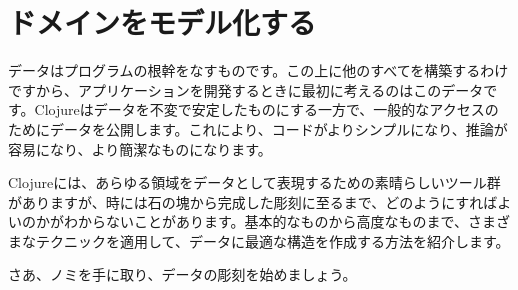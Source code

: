 \chapter{ドメインをモデル化する}


データはプログラムの根幹をなすものです。この上に他のすべてを構築するわけですから、アプリケーションを開発するときに最初に考えるのはこのデータです。Clojureはデータを不変で安定したものにする一方で、一般的なアクセスのためにデータを公開します。これにより、コードがよりシンプルになり、推論が容易になり、より簡潔なものになります。

Clojureには、あらゆる領域をデータとして表現するための素晴らしいツール群がありますが、時には石の塊から完成した彫刻に至るまで、どのようにすればよいのかがわからないことがあります。基本的なものから高度なものまで、さまざまなテクニックを適用して、データに最適な構造を作成する方法を紹介します。

さあ、ノミを手に取り、データの彫刻を始めましょう。



  
              
    
    